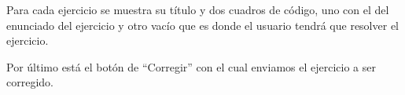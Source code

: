 \vspace{1em}

Para cada ejercicio se muestra su título y dos cuadros de código, uno con el del enunciado del ejercicio y otro vacío que es donde el usuario tendrá que resolver el ejercicio.

\vspace{1em}

Por último está el botón de ``Corregir'' con el cual enviamos el ejercicio a ser corregido.

\begin{figure}[H]
\begin{center}
\end{center}
\end{figure}

